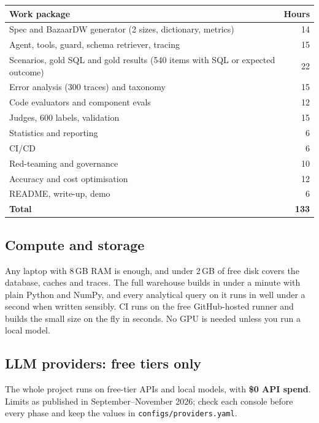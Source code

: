 \documentclass[11pt,a4paper]{article}
\newcommand{\code}[1]{\texttt{\small #1}}
\begin{document}
\begin{center}
\small
\begin{tabular}{@{}l r@{}}
\toprule
\textbf{Work package} & \textbf{Hours}\\
\midrule
Spec and BazaarDW generator (2 sizes, dictionary, metrics) & 14\\
Agent, tools, guard, schema retriever, tracing & 15\\
Scenarios, gold SQL and gold results (540 items with SQL or expected outcome) & 22\\
Error analysis (300 traces) and taxonomy & 15\\
Code evaluators and component evals & 12\\
Judges, 600 labels, validation & 15\\
Statistics and reporting & 6\\
CI/CD & 6\\
Red-teaming and governance & 10\\
Accuracy and cost optimisation & 12\\
README, write-up, demo & 6\\
\midrule
\textbf{Total} & \textbf{133}\\
\bottomrule
\end{tabular}
\end{center}

\subsection{Compute and storage}

Any laptop with 8\,GB RAM is enough, and under 2\,GB of free disk covers the database, caches
and traces. The full warehouse builds in under a minute with plain Python and NumPy, and every
analytical query on it runs in well under a second when written sensibly. CI runs on the free
GitHub-hosted runner and builds the small size on the fly in seconds. No GPU is needed unless you
run a local model.

\subsection{LLM providers: free tiers only}

The whole project runs on free-tier APIs and local models, with \textbf{\$0 API spend}. Limits as
published in September--November 2026; check each console before every phase and keep the values
in \code{configs/providers.yaml}.
\end{document}
